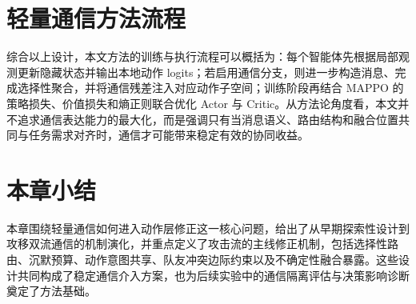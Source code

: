 \section{轻量通信方法流程}

综合以上设计，本文方法的训练与执行流程可以概括为：每个智能体先根据局部观测更新隐藏状态并输出本地动作 logits；若启用通信分支，则进一步构造消息、完成选择性聚合，并将通信残差注入对应动作子空间；训练阶段再结合 MAPPO 的策略损失、价值损失和熵正则联合优化 Actor 与 Critic。从方法论角度看，本文并不追求通信表达能力的最大化，而是强调只有当消息语义、路由结构和融合位置共同与任务需求对齐时，通信才可能带来稳定有效的协同收益。

\section{本章小结}

本章围绕轻量通信如何进入动作层修正这一核心问题，给出了从早期探索性设计到攻移双流通信的机制演化，并重点定义了攻击流的主线修正机制，包括选择性路由、沉默预算、动作意图共享、队友冲突边际约束以及不确定性融合暴露。这些设计共同构成了稳定通信介入方案，也为后续实验中的通信隔离评估与决策影响诊断奠定了方法基础。
